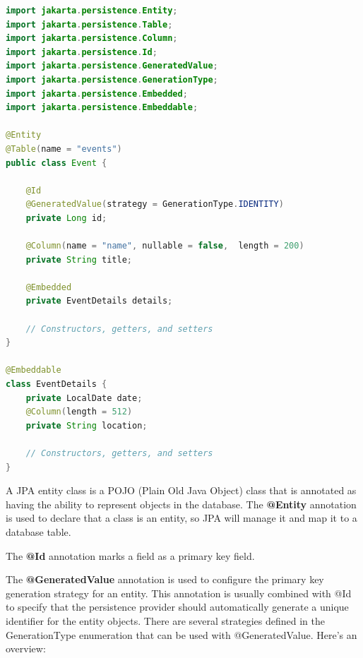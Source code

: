 \begin{lstlisting}[frame=single,language=java]
import jakarta.persistence.Entity;
import jakarta.persistence.Table;
import jakarta.persistence.Column;
import jakarta.persistence.Id;
import jakarta.persistence.GeneratedValue;
import jakarta.persistence.GenerationType;
import jakarta.persistence.Embedded;
import jakarta.persistence.Embeddable;

@Entity
@Table(name = "events")
public class Event {

    @Id
    @GeneratedValue(strategy = GenerationType.IDENTITY)
    private Long id;

    @Column(name = "name", nullable = false,  length = 200)
    private String title;

    @Embedded
    private EventDetails details;

    // Constructors, getters, and setters
}

@Embeddable
class EventDetails {
    private LocalDate date;
    @Column(length = 512)
    private String location;

    // Constructors, getters, and setters
}
\end{lstlisting}

A JPA entity class is a POJO (Plain Old Java Object) class  that is annotated as having the ability to represent objects in the database.
The \textbf{@Entity} annotation is used to declare that a class is an entity, so JPA will manage it and map it to a database table.

The \textbf{@Id} annotation marks a field as a primary key field.

The \textbf{@GeneratedValue} annotation is used to configure the primary key generation strategy for an entity. This annotation is usually combined with @Id to specify that the persistence provider should automatically generate a unique identifier for the entity objects. There are several strategies defined in the GenerationType enumeration that can be used with @GeneratedValue. Here's an overview:


